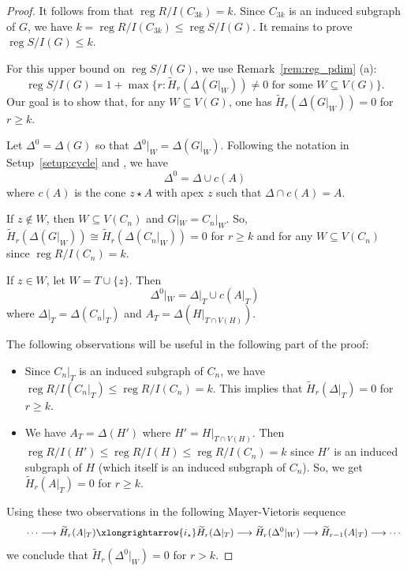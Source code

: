 \documentclass[12pt]{amsart}
\theoremstyle{plain}
\theoremstyle{definition}
\DeclareMathOperator{\reg}{reg}
\begin{document}
\begin{proof}
It follows from  \cite[Theorem 5.2]{Selvi_cycles} that  $\reg R/I(C_{3k}) = k$. Since $C_{3k}$ is an induced subgraph of $G$, we have $ k=\reg R/I(C_{3k})  \leq \reg S/I(G)$. It remains to prove $\reg S/I(G) \leq k$. 
    
    
    For this upper bound on $\reg S/I(G)$, we use Remark~\ref{rem:reg_pdim} (a):
    $$ \reg S/I(G) = 1+ \max \{ r : \widetilde{H}_r (\Delta(G|_W)) \neq 0 \text{ for some } W \subseteq V(G)\}.$$
Our goal is to show that, for any $W \subseteq V(G)$, one has  $\widetilde{H}_r (\Delta(G|_W))=0$ for $r\geq k$. 

    Let $\Delta^0= \Delta (G)$ so that $\Delta^0|_W= \Delta(G|_W)$. Following the notation in Setup~\ref{setup:cycle} and , we have
    $$\Delta^0= \Delta \cup c(A)$$
    where  $c(A)$ is the cone $z\star A$  with apex $z$ such that $\Delta \cap c(A)=A$.


    If $z\notin W$, then $W\subseteq V(C_n)$ and $G|_W=C_n|_W$. So, $\widetilde{H}_r (\Delta(G|_W))  \cong  \widetilde{H}_r (\Delta(C_n|_W))=0$ for $r\geq k$ and  for any $W\subseteq V(C_n)$ since $\reg R/I(C_n)=k$. 


    If $z\in W$, let $W=T\cup \{z\}$. Then
    $$\Delta^0|_W = \Delta|_T \cup c( A|_T)$$
    where $\Delta|_T= \Delta (C_n|_T)$ and $A_T= \Delta (H|_{T \cap V(H)}).$

    The following observations will be useful in the following part of the proof:
    \begin{itemize}
        \item Since  $C_n|_T$ is an induced subgraph of $C_n$, we have  $\reg R/ I(C_n|_T) \leq \reg R/ I(C_n)= k$. This  implies that $\widetilde{H}_r (\Delta|_T) =0$ for $r\geq k$.
        \item We have $A_T = \Delta (H')$ where  $H'=H|_{T \cap V(H)}$. Then $\reg R/I(H')\leq \reg R/I(H) \leq \reg R/I(C_n) = k$ since $H'$ is  an induced subgraph of $H$ (which itself is an induced subgraph of $C_n$). So, we get $\widetilde{H}_r (A|_T) =0$ for $r\geq k$.
    \end{itemize}
Using these two observations in the following Mayer-Vietoris sequence
$$  ~~~~~~\cdots \longrightarrow \widetilde{H}_r (A|_T) \xlongrightarrow {i_{\star}} \widetilde{H}_r (\Delta|_T)  \longrightarrow \widetilde{H}_r (\Delta^0|_W) \longrightarrow \widetilde{H}_{r-1} (A|_T)  \longrightarrow  \cdots$$
we conclude that $\widetilde{H}_r (\Delta^0|_W) =0$ for $r>k$.


\end{proof}
\end{document}
